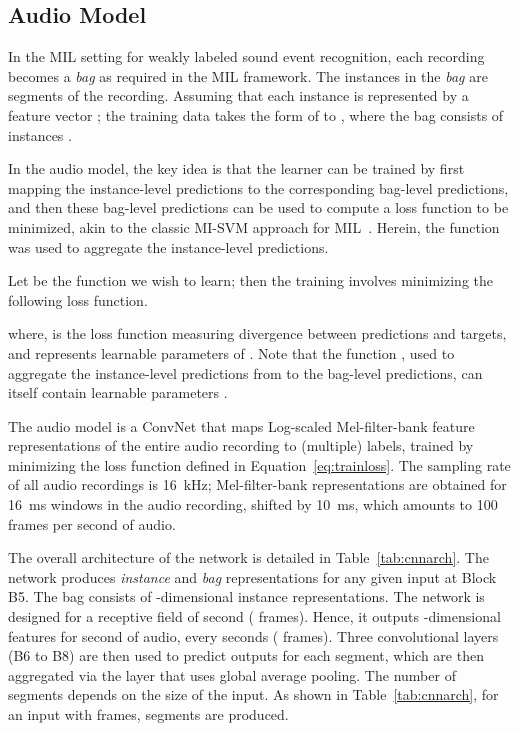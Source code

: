 \documentclass{article}
\begin{document}
\subsection{Audio Model}\label{ssec:audio}
In the MIL setting for weakly labeled sound event recognition, each recording becomes a {\em bag} as required in the MIL framework.
The instances in the {\em bag } are segments of the recording.
Assuming that each instance is represented by a feature vector ;
the training data takes the form of  to , where the  bag consists of  instances .

In the audio model, the key idea is that the learner can be trained by first mapping the instance-level predictions to the corresponding bag-level predictions, and then these bag-level predictions can be used to compute a loss function to be minimized, akin to the classic MI-SVM approach for MIL~\cite{andrews2003support}.
Herein, the  function was used to aggregate the instance-level predictions.

Let  be the function we wish to learn;
then the training involves minimizing the following loss function.

where,  is the loss function measuring divergence between predictions and targets, and  represents learnable parameters of .
Note that the function , used to aggregate the instance-level predictions from  to the bag-level predictions, can itself contain learnable parameters .

The audio model is a ConvNet that maps Log-scaled Mel-filter-bank feature representations of the entire audio recording to (multiple) labels, trained by minimizing the loss function defined in Equation~\ref{eq:trainloss}.
The sampling rate of all audio recordings is \SI{16}{kHz};  Mel-filter-bank representations are obtained for \SI{16}{ms} windows in the audio recording, shifted by \SI{10}{ms}, which amounts to 100 frames per second of audio.

The overall architecture of the network is detailed in Table~\ref{tab:cnnarch}. The network produces {\em instance} and {\em bag} representations for any given input at Block B5. The bag consists of -dimensional instance representations. 
The network is designed for a receptive field of \texttildelow second ( frames). Hence, it outputs -dimensional features for \texttildelow second of audio, every \texttildelow seconds ( frames).
Three  convolutional layers (B6 to B8) are then used to predict outputs for each segment, which are then aggregated via the layer  that uses global average pooling.
The number of segments depends on the size of the input.
As shown in Table~\ref{tab:cnnarch}, for an input with  frames,  segments are produced.
\end{document}
